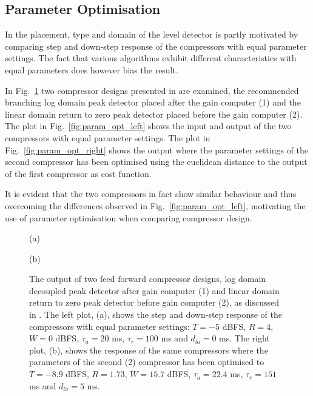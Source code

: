 \documentclass[../main2.tex]{subfiles}
\providecommand{\rootdir}{..}
\begin{document}
\subsection{Parameter Optimisation}\label{parameter_optimisation}
In \cite{reiss2012tutorial} the placement, type and domain of the level detector is partly motivated by comparing step and down-step response of the compressors with equal parameter settings. The fact that various algorithms exhibit different characteristics with equal parameters does however bias the result. 

In Fig.~\ref{fig:param_opt} two compressor designs presented in \cite{reiss2012} are examined, the recommended branching log domain peak detector placed after the gain computer (1) and the linear domain return to zero peak detector placed before the gain computer (2). The plot in Fig.~\ref{fig:param_opt_left} shows the input and output of the two compressors with equal parameter settings. The plot in Fig.~\ref{fig:param_opt_right} shows the output where the parameter settings of the second compressor has been optimised using the euclidean distance to the output of the first compressor as cost function. 

It is evident that the two compressors in fact show similar behaviour and thus overcoming the differences observed in Fig.~\ref{fig:param_opt_left}, motivating the use of parameter optimisation when comparing compressor design.
\begin{figure}[ht]
\captionsetup*{justification=centering}
\begin{minipage}[t]{.5\textwidth}
 \centering

\caption*{(a)} 
\label{fig:param_opt_left}
\end{minipage}%
\begin{minipage}[t]{.5\textwidth}
\centering

\caption*{(b)} 
\label{fig:param_opt_right}
\end{minipage}
\caption{The output of two feed forward compressor designs, log domain decoupled peak detector after gain computer (1) and linear domain return to zero peak detector before gain computer (2), as discussed in \cite{reiss2012tutorial}. The left plot, (a), shows the step and down-step response of the compressors with equal parameter settings: $T = -5$ dBFS, $R=4$, $W=0$ dBFS, $\tau_a = 20$ ms, $\tau_r = 100$ ms and $d_{la}=0$ ms. The right plot, (b), shows the response of the same compressors where the parameters of the second (2) compressor has been optimised to $T = -8.9$ dBFS, $R=1.73$, $W=15.7$ dBFS, $\tau_a = 22.4$ ms, $\tau_r = 151$ ms and $d_{la}=5$ ms.}
\label{fig:param_opt}
\end{figure}
\end{document}
